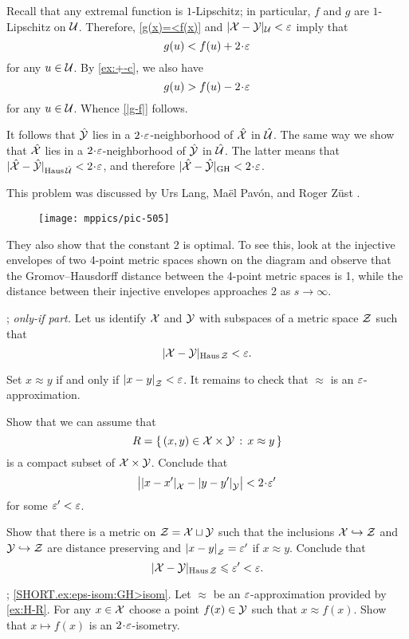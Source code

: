 Recall that any extremal function is $1$-Lipschitz;
in particular, $f$ and $g$ are $1$-Lipschitz on $\mathcal{U}$.
Therefore, \ref{g(x)=<f(x)} and $|\mathcal{X}-\mathcal{Y}|_{\mathcal{U}}<\varepsilon$ imply that
\[g(u)< f(u)+2\cdot \eps\]
for any $u\in\mathcal{U}$.
By \ref{ex:+-c}, we also have 
\[g(u)> f(u)-2\cdot \eps\]
for any $u\in\mathcal{U}$.
Whence \ref{|g-f|} follows.

It follows that $\hat{\mathcal{Y}}$ lies in a $2\cdot\eps$-neighborhood of $\hat{\mathcal{X}}$ in $\hat{\mathcal{U}}$.
The same way we show that $\hat{\mathcal{X}}$ lies in a $2\cdot\eps$-neighborhood of $\hat{\mathcal{Y}}$ in $\hat{\mathcal{U}}$.
The latter means that
$|\hat{\spc{X}}-\hat{\spc{Y}}|_{\Haus\hat{\spc{U}}}<2\cdot\eps$,
and therefore
$|\hat{\spc{X}}-\hat{\spc{Y}}|_{\GH}<2\cdot\eps$.

This problem was discussed by Urs Lang, Maël Pavón, and Roger Züst \cite[3.1]{lang-pavon-zust}.
\begin{figure}[h!]
\vskip-0mm
\centering
\texttt{[image: mppics/pic-505]}
\end{figure}
They also show that the constant 2 is optimal.
To see this, look at the injective envelopes of two 4-point metric spaces shown on the diagram and observe that the Gromov--Hausdorff distance between the 4-point metric spaces is 1, while the distance between their injective envelopes approaches 2 as $s\to\infty$. 

\parbf{\ref{ex:H-R}}; \textit{only-if part.}
Let us identify $\mathcal{X}$ and $\mathcal{Y}$ with subspaces of a metric space $\mathcal{Z}$ such that 
\[|\mathcal{X}-\mathcal{Y}|_{\operatorname{\rm Haus}\nolimits \mathcal{Z}}<\varepsilon.\]

Set $x\approx y$ if and only if $\dist{x}{y}{\spc{Z}}<\eps$.
It remains to check that $\approx$ is an $\varepsilon$-approximation.

Show that we can assume that 
\[R=\left\{\,{(x,y)\in\mathcal{X}\times\mathcal{Y}}\,:\,{x\approx y}\,\right\}\] is a compact subset of $\mathcal{X}\times\mathcal{Y}$.
Conclude that
\[\bigl|\dist{x}{x'}{\spc{X}}-\dist{y}{y'}{\spc{Y}}\bigr|<2\cdot\eps'\]
for some $\varepsilon'<\varepsilon$.

Show that there is a metric on $\mathcal{Z}=\mathcal{X}\sqcup\mathcal{Y}$ such that the inclusions $\mathcal{X}\hookrightarrow\mathcal{Z}$ and
$\mathcal{Y}\hookrightarrow\mathcal{Z}$ are distance preserving and $\dist{x}{y}{\spc{Z}}=\eps'$ if $x\approx y$.
Conclude that 
\[|\mathcal{X}-\mathcal{Y}|_{\operatorname{\rm Haus}\nolimits \mathcal{Z}}\leqslant\varepsilon'<\varepsilon.\]

\parbf{\ref{ex:eps-isom}};
\ref{SHORT.ex:eps-isom:GH>isom}.
Let $\approx$ be an $\varepsilon$-approximation provided by \ref{ex:H-R}.
For any $x\in\mathcal{X}$ choose a point $f(x)\in\mathcal{Y}$ such that $x\approx f(x)$.
Show that $x\mapsto f(x)$ is an $2\cdot\eps$-isometry.

